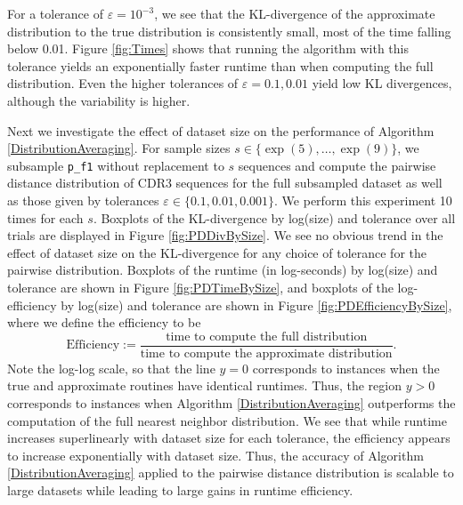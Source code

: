 \documentclass{article}
\begin{document}
For a tolerance of $\varepsilon = 10^{-3}$, we see that the KL-divergence of the approximate distribution to the true distribution is consistently small, most of the time falling below 0.01.
Figure \ref{fig:Times} shows that running the algorithm with this tolerance yields an exponentially faster runtime than when computing the full distribution.
Even the higher tolerances of $\varepsilon = 0.1, 0.01$ yield low KL divergences, although the variability is higher.

Next we investigate the effect of dataset size on the performance of Algorithm \ref{DistributionAveraging}.
For sample sizes $s \in \{\exp(5), \dotsc, \exp(9)\}$, we subsample \texttt{p\_f1} without replacement to $s$ sequences and compute the pairwise distance distribution of CDR3 sequences for the full subsampled dataset as well as those given by tolerances $\varepsilon \in \{0.1, 0.01, 0.001\}$.
We perform this experiment 10 times for each $s$.
Boxplots of the KL-divergence by log(size) and tolerance over all trials are displayed in Figure \ref{fig:PDDivBySize}.
We see no obvious trend in the effect of dataset size on the KL-divergence for any choice of tolerance for the pairwise distribution.
Boxplots of the runtime (in log-seconds) by log(size) and tolerance are shown in Figure \ref{fig:PDTimeBySize}, and boxplots of the log-efficiency by log(size) and tolerance are shown in Figure \ref{fig:PDEfficiencyBySize}, where we define the efficiency to be
\begin{equation}\label{eq:Efficiency}
	\text{Efficiency} :=
		\frac{\text{time to compute the full distribution}
		}{
			  \text{time to compute the approximate distribution}
		}.
\end{equation}
Note the log-log scale, so that the line $y=0$ corresponds to instances when the true and approximate routines have identical runtimes.
Thus, the region $y > 0$ corresponds to instances when Algorithm \ref{DistributionAveraging} outperforms the computation of the full nearest neighbor distribution.
We see that while runtime increases superlinearly with dataset size for each tolerance, the efficiency appears to increase exponentially with dataset size.
Thus, the accuracy of Algorithm \ref{DistributionAveraging} applied to the pairwise distance distribution is scalable to large datasets while leading to large gains in runtime efficiency.
\end{document}
